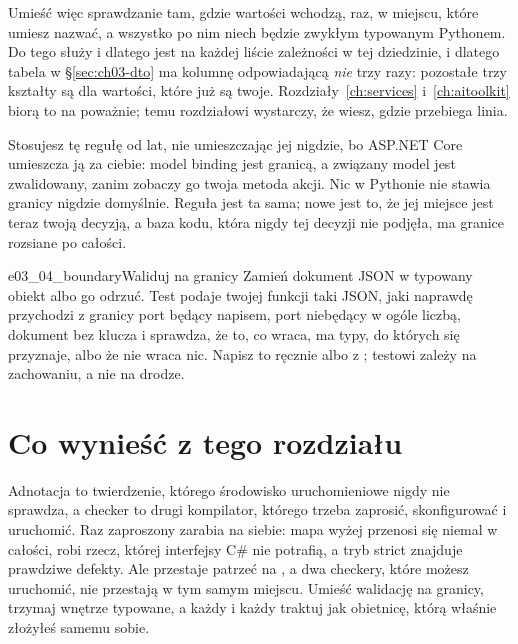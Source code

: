 Umieść więc sprawdzanie tam, gdzie wartości wchodzą, raz, w miejscu, które
umiesz nazwać, a wszystko po nim niech będzie zwykłym typowanym Pythonem. Do
tego służy  i dlatego jest na każdej liście zależności w tej
dziedzinie, i dlatego tabela w \S\ref{sec:ch03-dto} ma kolumnę
odpowiadającą \emph{nie} trzy razy: pozostałe trzy kształty są dla wartości,
które już są twoje. Rozdziały~\ref{ch:services} i~\ref{ch:aitoolkit} biorą to
na poważnie; temu rozdziałowi wystarczy, że wiesz, gdzie przebiega linia.

\begin{csbox}
Stosujesz tę regułę od lat, nie umieszczając jej nigdzie, bo ASP.NET Core
umieszcza ją za ciebie: model binding jest granicą, a związany model jest
zwalidowany, zanim zobaczy go twoja metoda akcji. Nic w Pythonie nie stawia
granicy nigdzie domyślnie. Reguła jest ta sama; nowe jest to, że jej miejsce
jest teraz twoją decyzją, a baza kodu, która nigdy tej decyzji nie podjęła,
ma granice rozsiane po całości.
\end{csbox}

\begin{exercise}{e03_04_boundary}{Waliduj na granicy}
Zamień dokument JSON w typowany obiekt albo go odrzuć. Test podaje twojej
funkcji taki JSON, jaki naprawdę przychodzi z granicy \dash{} port będący
napisem, port niebędący w ogóle liczbą, dokument bez klucza \dash{} i
sprawdza, że to, co wraca, ma typy, do których się przyznaje, albo że nie
wraca nic. Napisz to ręcznie albo z ; testowi zależy na
zachowaniu, a nie na drodze.
\end{exercise}

\section{Co wynieść z tego rozdziału}
\label{sec:ch03-summary}

Adnotacja to twierdzenie, którego środowisko uruchomieniowe nigdy nie
sprawdza, a checker to drugi kompilator, którego trzeba zaprosić,
skonfigurować i uruchomić. Raz zaproszony zarabia na siebie: mapa wyżej
przenosi się niemal w całości,  robi rzecz, której interfejsy
C\# nie potrafią, a tryb strict znajduje prawdziwe defekty. Ale przestaje
patrzeć na , a dwa checkery, które możesz uruchomić, nie przestają w
tym samym miejscu. Umieść walidację na granicy, trzymaj wnętrze typowane, a
każdy  i każdy  traktuj jak obietnicę, którą
właśnie złożyłeś samemu sobie.
